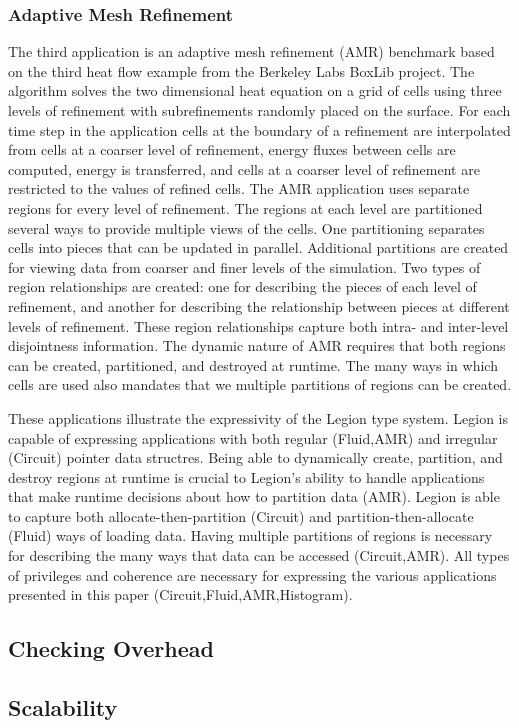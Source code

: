 \subsubsection{Adaptive Mesh Refinement}
\label{subsec:amr}
The third application is an adaptive mesh refinement (AMR) benchmark based on the third heat flow
example from the Berkeley Labs BoxLib project\cite{BoxLib}.  The algorithm solves the two
dimensional heat equation on a grid of cells using three levels of refinement with subrefinements
randomly placed on the surface.  For each time step in the application cells at the boundary of
a refinement are interpolated from cells at a coarser level of refinement, energy fluxes between
cells are computed, energy is transferred, and cells at a coarser level of refinement are restricted
to the values of refined cells.  The AMR application uses separate regions for every level of
refinement.  The regions at each level are partitioned several ways to provide multiple views of
the cells.  One partitioning separates cells into pieces that can be updated in
parallel.  Additional partitions are created for viewing data from coarser and finer levels of
the simulation.  Two types of region relationships are created: one for describing the pieces of
each level of refinement, and another for describing the relationship between pieces at different
levels of refinement.  These region relationships capture both intra- and inter-level disjointness
information.  The dynamic nature of AMR requires that both regions can be created, partitioned,
and destroyed at runtime.  The many ways in which cells are used also mandates that we multiple
partitions of regions can be created.

These applications illustrate the expressivity of the Legion type system.  Legion is capable of 
expressing applications with both regular (Fluid,AMR) and irregular (Circuit) pointer data structres.
Being able to dynamically create, partition, and destroy regions at runtime is crucial to Legion's
ability to handle applications that make runtime decisions about how to partition data (AMR).  Legion
is able to capture both allocate-then-partition (Circuit) and partition-then-allocate (Fluid) ways 
of loading data.  Having multiple partitions of regions is necessary for describing the many ways 
that data can be accessed (Circuit,AMR).  All types of privileges and coherence are necessary for 
expressing the various applications presented in this paper (Circuit,Fluid,AMR,Histogram).


\subsection{Checking Overhead}
\label{subsec:overhead}

\subsection{Scalability}
\label{subsec:scalability}
